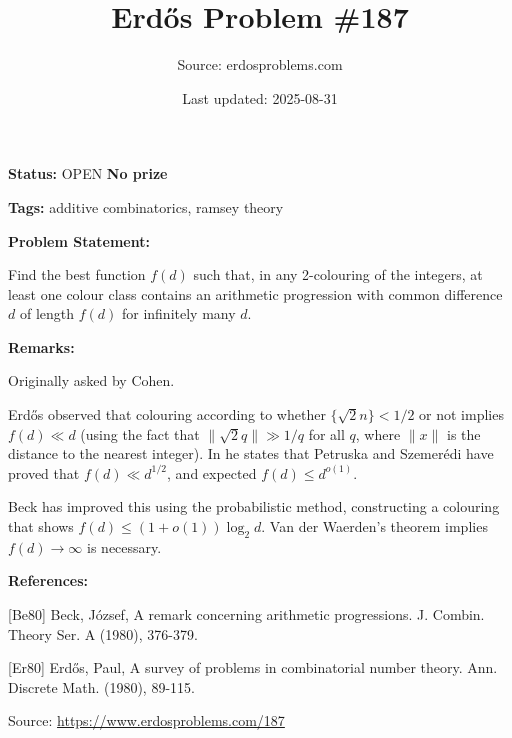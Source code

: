 \documentclass{article}
\title{Erd\H{o}s Problem \#187}
\date{Last updated: 2025-08-31}
\author{Source: erdosproblems.com}
\begin{document}
\maketitle

\noindent\textbf{Status:} OPEN \quad \textbf{No prize}

\noindent\textbf{Tags:} additive combinatorics, ramsey theory

\medskip
\noindent\textbf{Problem Statement:}

Find the best function $f(d)$ such that, in any 2-colouring of the integers, at least one colour class contains an arithmetic progression with common difference $d$ of length $f(d)$ for infinitely many $d$.

\bigskip
\noindent\textbf{Remarks:}

Originally asked by Cohen. 

Erd\H{o}s observed that colouring according to whether $\{ \sqrt{2}n\}<1/2$ or not implies $f(d) \ll d$ (using the fact that $\|\sqrt{2}q\| \gg 1/q$ for all $q$, where $\|x\|$ is the distance to the nearest integer). In \cite{Er80} he states that Petruska and Szemer\'{e}di have proved that $f(d) \ll d^{1/2}$, and expected $f(d)\leq d^{o(1)}$.

Beck \cite{Be80} has improved this using the probabilistic method, constructing a colouring that shows $f(d)\leq (1+o(1))\log_2 d$. Van der Waerden's theorem implies $f(d)\to \infty$ is necessary.

\bigskip
\noindent\textbf{References:}

[Be80] Beck, J\'{o}zsef, A remark concerning arithmetic progressions. J. Combin. Theory Ser. A (1980), 376-379.
 
 [Er80] Erd\H{o}s, Paul, A survey of problems in combinatorial number theory. Ann. Discrete Math. (1980), 89-115.

\bigskip
\noindent\small{Source: \url{https://www.erdosproblems.com/187}}
\end{document}
